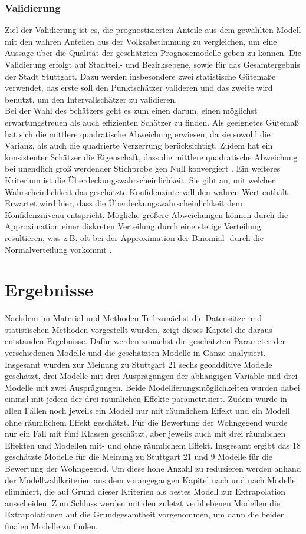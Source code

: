 \documentclass{Vorlage}
\begin{document}
\subsubsection{Validierung}
Ziel der Validierung ist es, die prognostizierten Anteile aus dem gewählten Modell mit den wahren Anteilen aus der 
Volksabstimmung \cite{Amt} zu vergleichen, um eine Aussage über die Qualität der geschätzten Prognosemodelle geben zu 
können. Die Validierung erfolgt auf Stadtteil- und Bezirksebene, sowie für das Gesamtergebnis der Stadt Stuttgart. Dazu 
werden insbesondere zwei statistische Gütemaße verwendet, das erste soll den Punktschätzer valideren und das zweite wird benutzt, um den Intervallschätzer zu validieren.\\
Bei der Wahl des Schätzers geht es zum einen darum, einen möglichst erwartungstreuen als auch effizienten Schätzer zu 
finden. Als geeignetes Gütemaß hat sich die mittlere quadratische Abweichung erwiesen, da sie sowohl die Varianz, als 
auch die quadrierte Verzerrung berücksichtigt. Zudem hat ein konsistenter Schätzer die Eigenschaft, dass die mittlere 
quadratische Abweichung bei unendlich groß werdender Stichprobe gen Null konvergiert \cite[p. 201]{HOG}. Ein weiteres 
Kriterium ist die Überdeckungswahrscheinlichkeit. Sie gibt an, mit welcher Wahrscheinlichkeit das geschätzte 
Konfidenzintervall den wahren Wert enthält. Erwartet wird hier, dass die Überdeckungswahrscheinlichkeit dem 
Konfidenzniveau entspricht. Mögliche größere Abweichungen können durch die Approximation einer diskreten Verteilung 
durch eine stetige Verteilung resultieren, was z.B. oft bei der Approximation der Binomial- durch die Normalverteilung 
vorkommt \cite[p. 102]{Int}.

\section{Ergebnisse}
Nachdem im Material und Methoden Teil zunächst die Datensätze und statistischen Methoden vorgestellt wurden, zeigt dieses Kapitel die daraus entstanden Ergebnisse. Dafür werden zunächst die geschätzten Parameter der verschiedenen Modelle und die geschätzten Modelle in Gänze analysiert. Insgesamt wurden zur Meinung zu Stuttgart 21 sechs geoadditive Modelle geschätzt, drei Modelle mit drei Ausprägungen der abhängigen Variable und drei Modelle mit zwei Ausprägungen. Beide Modellierungsmöglichkeiten wurden dabei einmal mit jedem der drei räumlichen Effekte parametrisiert. Zudem wurde in allen Fällen noch jeweils ein Modell nur mit räumlichem Effekt und ein Modell ohne räumlichem Effekt geschätzt. Für die Bewertung der Wohngegend wurde nur ein Fall mit fünf Klassen geschätzt, aber jeweils auch mit drei räumlichen Effekten und Modellen mit- und ohne räumlichem Effekt. Insgesamt ergibt das 18 geschätzte Modelle für die Meinung zu Stuttgart 21 und 9 Modelle für die Bewertung der Wohngegend. Um diese hohe Anzahl zu reduzieren werden anhand der Modellwahlkriterien aus dem vorangegangen Kapitel nach und nach Modelle eliminiert, die auf Grund dieser Kriterien als bestes Modell zur Extrapolation ausscheiden. Zum Schluss werden mit den zuletzt verbliebenen Modellen die Extrapolationen auf die Grundgesamtheit vorgenommen, um dann die beiden finalen Modelle zu finden. 
\end{document}
